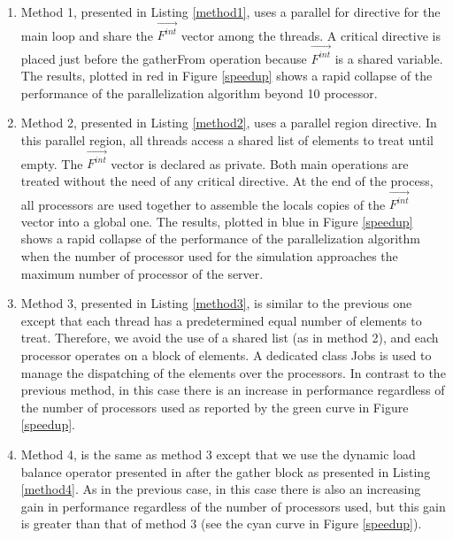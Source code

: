 \begin{enumerate}
\item Method 1, presented in Listing \ref{method1}, uses a parallel for directive for the main loop and share the $\overrightarrow{F^{int}}$ vector among the threads. A critical directive is placed just before the gatherFrom operation because $\overrightarrow{F^{int}}$ is a shared variable. The results, plotted in red in Figure \ref{speedup} shows a rapid collapse of the performance of the parallelization algorithm beyond 10 processor.

\item Method 2, presented in Listing \ref{method2}, uses a parallel region directive. In this parallel region, all threads access a shared list of elements to treat until empty. The $\overrightarrow{F^{int}}$ vector is declared as private. Both main operations are treated without the need of any critical directive. At the end of the process, all processors are used together to assemble the locals copies of the $\overrightarrow{F^{int}}$ vector into a global one. The results, plotted in blue in Figure \ref{speedup} shows a rapid collapse of the performance of the parallelization algorithm when the number of processor used for the simulation approaches the maximum number of processor of the server.

\item Method 3, presented in Listing \ref{method3}, is similar to the previous one except that each thread has a predetermined equal number of elements to treat. Therefore, we avoid the use of a shared list (as in method 2), and each processor operates on a block of elements. A dedicated class Jobs is used to manage the dispatching of the elements over the processors. In contrast to the previous method, in this case there is an increase in performance regardless of the number of processors used as reported by the green curve in Figure \ref{speedup}.

\item Method 4, is the same as method 3 except that we use the dynamic load balance operator presented in \cite{Pantale:2005} after the gather block as presented in Listing \ref{method4}. As in the previous case, in this case there is also an increasing gain in performance regardless of the number of processors used, but this gain is greater than that of method 3 (see the cyan curve in Figure \ref{speedup}).

\end{enumerate}


